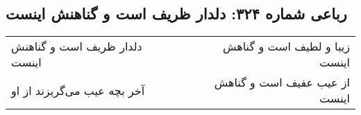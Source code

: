 \begin{center}
\section*{رباعی شماره ۳۲۴: دلدار ظریف است و گناهنش اینست}
\label{sec:0324}
\begin{longtable}{l p{0.5cm} r}
دلدار ظریف است و گناهنش اینست
&&
زیبا و لطیف است و گناهش اینست
\\
آخر بچه عیب می‌گریزند از او
&&
از عیب عفیف است و گناهش اینست
\\
\end{longtable}
\end{center}
